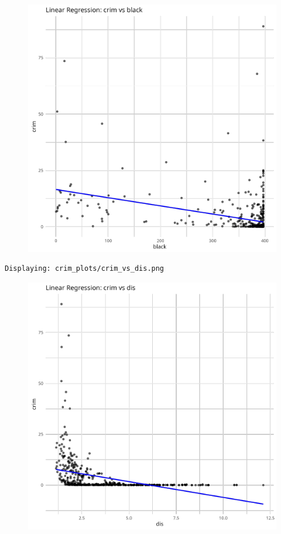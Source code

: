 \documentclass[
]{article}
\begin{document}
\begin{figure}[H]

{\centering \includegraphics{hw1_files/figure-pdf/unnamed-chunk-16-2.pdf}

}

\end{figure}

\begin{verbatim}
Displaying: crim_plots/crim_vs_dis.png 
\end{verbatim}

\begin{figure}[H]

{\centering \includegraphics{hw1_files/figure-pdf/unnamed-chunk-16-3.pdf}

}

\end{figure}
\end{document}
